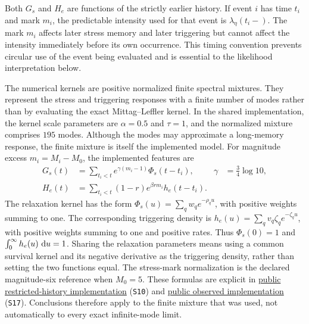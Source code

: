 Both \(G_s\) and \(H_e\) are functions of the strictly earlier history. If event \(i\) has time \(t_i\) and mark \(m_i\), the predictable intensity used for that event is \(\lambda_\eta(t_i-)\). The mark \(m_i\) affects later stress memory and later triggering but cannot affect the intensity immediately before its own occurrence. This timing convention prevents circular use of the event being evaluated and is essential to the likelihood interpretation below.

The numerical kernels are positive normalized finite spectral mixtures. They represent the stress and triggering responses with a finite number of modes rather than by evaluating the exact Mittag--Leffler kernel. In the shared implementation, the kernel scale parameters are \(\alpha=0.5\) and \(\tau=1\), and the normalized mixture comprises \(195\) modes. Although the modes may approximate a long-memory response, the finite mixture is itself the implemented model. For magnitude excess \(m_i=M_i-M_0\), the implemented features are
\begin{align}
 G_s(t)&=\sum_{t_i<t} e^{\gamma(m_i-1)}\Phi_s(t-t_i),
       &\gamma&=\tfrac34\log 10,\\
 H_e(t)&=\sum_{t_i<t}(1-r)e^{\beta r m_i}h_e(t-t_i).
 \label{eq:diagnostic-features}
\end{align}
The relaxation kernel has the form \(\Phi_s(u)=\sum_qw_qe^{-\rho_qu}\), with positive weights summing to one. The corresponding triggering density is \(h_e(u)=\sum_qv_q\zeta_qe^{-\zeta_qu}\), with positive weights summing to one and positive rates. Thus \(\Phi_s(0)=1\) and \(\int_0^\infty h_e(u)\,\mathop{}\!\mathrm{d} u=1\). Sharing the relaxation parameters means using a common survival kernel and its negative derivative as the triggering density, rather than setting the two functions equal. The stress-mark normalization is the declared magnitude-six reference when \(M_0=5\). These formulas are explicit in \href{https://github.com/Drefetr/InhibitoryEarthquakeModels/blob/3e76a174cf4f58ce601c6c9640c4d0c11168813f/engine/iteration_20/code/restricted_history.py}{public restricted-history implementation} (\texttt{S10}) and \href{https://github.com/Drefetr/InhibitoryEarthquakeModels/blob/3e76a174cf4f58ce601c6c9640c4d0c11168813f/engine/iteration_27/code/adequacy.py}{public observed implementation} (\texttt{S17}). Conclusions therefore apply to the finite mixture that was used, not automatically to every exact infinite-mode limit.

